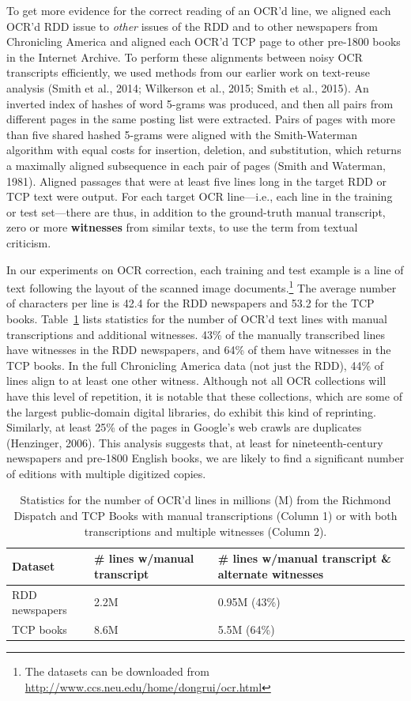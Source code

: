 \documentclass[twoside,11pt]{report}
\begin{document}
To get more evidence for the correct reading of an OCR'd line, we aligned each OCR'd RDD issue to \emph{other} issues of the RDD and to other newspapers from Chronicling America and aligned each OCR'd TCP page to other pre-1800 books in the Internet Archive. To perform these alignments between noisy OCR transcripts efficiently, we used methods from our earlier work on text-reuse analysis (Smith et al., 2014; Wilkerson et al., 2015; Smith et al., 2015). An inverted index of hashes of word 5-grams was produced, and then all pairs from different pages in the same posting list were extracted. Pairs of pages with more than five shared hashed 5-grams were aligned with the Smith-Waterman algorithm with equal costs for insertion, deletion, and substitution, which returns a maximally aligned subsequence in each pair of pages (Smith and Waterman, 1981). Aligned passages that were at least five lines long in the target RDD or TCP text were output. For each target OCR line---i.e., each line in the training or test set---there are thus, in addition to the ground-truth manual transcript, zero or more \textbf{witnesses} from similar texts, to use the term from textual criticism.

In our experiments on OCR correction, each training and test example is a line of text following the layout of the scanned image documents.\footnote{The datasets can be downloaded from \url{http://www.ccs.neu.edu/home/dongrui/ocr.html}} The average number of characters per line is 42.4 for the RDD newspapers and 53.2 for the TCP books. Table~\ref{tab:reprints} lists statistics for the number of OCR'd text lines with manual transcriptions and additional witnesses. 43\% of the manually transcribed lines have witnesses in the RDD newspapers, and 64\% of them have witnesses in the TCP books. In the full Chronicling America data (not just the RDD), 44\% of lines align to at least one other witness. Although not all OCR collections will have this level of repetition, it is notable that these collections, which are some of the largest public-domain digital libraries, do exhibit this kind of reprinting. Similarly, at least 25\% of the pages in Google's web crawls are duplicates (Henzinger, 2006). This analysis suggests that, at least for nineteenth-century newspapers and pre-1800 English books, we are likely to find a significant number of editions with multiple digitized copies.

\begin{table}
  \centering
  \begin{tabular}{lp{}p{}}
    Dataset & \# lines w/manual transcript & \# lines w/manual transcript \& alternate witnesses \\ \hline
    RDD newspapers & 2.2M & 0.95M (43\%) \\
    TCP books & 8.6M & 5.5M (64\%) \\
  \end{tabular}
  \caption{Statistics for the number of OCR'd lines in millions (M) from the Richmond Dispatch and TCP Books with manual transcriptions (Column 1) or with both transcriptions and multiple witnesses (Column 2).}
  \label{tab:reprints}
\end{table}
\end{document}
